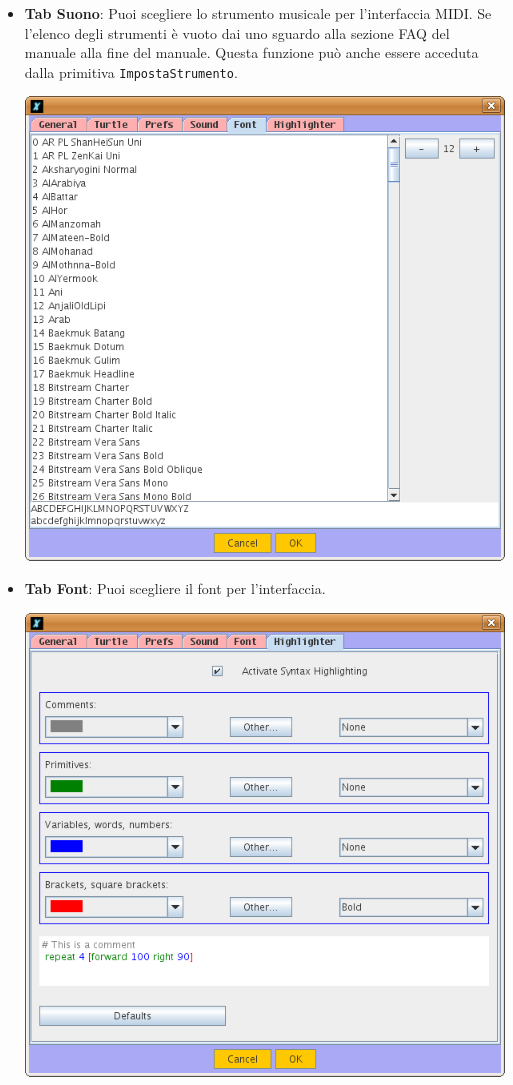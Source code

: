 \begin{itemize}
\begin{itemize}
\begin{center}
			\end{center}
			\vspace{0.25cm}
			\item \textbf{Tab Suono}: Puoi scegliere lo strumento musicale per l'interfaccia MIDI. Se l'elenco degli strumenti è vuoto dai uno sguardo alla sezione FAQ del manuale alla fine del manuale. Questa funzione può anche essere acceduta dalla primitiva \texttt{ImpostaStrumento}.
			\begin{center}
				\includegraphics[scale=0.4]{pics/interface-CapturePref5.png}
			\end{center}
			\vspace{0.25cm}
			\item \textbf{Tab Font}: Puoi scegliere il font per l'interfaccia.
			\begin{center}
				\includegraphics[scale=0.4]{pics/interface-CapturePref6.png}

\end{center}
\end{itemize}
\end{itemize}
